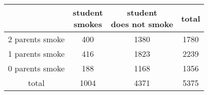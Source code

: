 \documentclass[a4paper,11pt]{article}
\begin{document}
 
\begin{table}[htbp]
\label{Tab:Moja tabela}
\begin{center}
\begin{tabular}{c|c c |c}
&\makecell[1]{student\\smokes} & \makecell[1]{student\\does not smoke}&total\\ \hline
2 parents smoke & 400 & 1380 & 1780\\
1 parents smoke & 416 & 1823 & 2239\\
0 parents smoke & 188 & 1168 & 1356\\ \hline
total&1004 & 4371 & 5375
\end{tabular}
\end{center}
\end{table}
 
\end{document}
